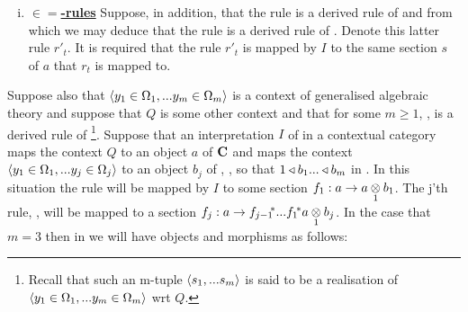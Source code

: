 \begin{enumerate}[(i)]
\item \underline{\textbf{$\boldsymbol{\in=}$-rules}} 
Suppose, in addition,  that the rule
is a derived rule of \gatUw and from which we may deduce that the rule
 is a  derived rule of \gatU. 
Denote this latter rule $r'_t$.
It is required that the rule $r'_t$ is mapped by $I$ to the same section $s$ of $a$ that $r_t$ is mapped to.
\end{enumerate}

\newpage

\label{omegarealisationwrtQ}
 Suppose also that $\encyOmega{m}$ is a context of generalised algebraic theory \gatUw and suppose that $Q$ is some other context and that for some $m \geq 1$,
 \foreachj,  is a derived rule of \gatU\footnote{Recall that such an m-tuple $\tuple{\sm}$ is said to be a realisation of 
$\encyOmega{m}$ wrt $Q$.}.  Suppose that an interpretation $I$ of \gatUw in a contextual category \catcw maps the context $Q$ to an object $a$  of $\catc$ and maps
the context $\encyOmega{j}$ to an object $b_j$ of \catc, \foreachj, so that $1 \base b_1 ... \base b_m$ in \catc. In this situation the rule 
 will be mapped by $I$ to some section $f_1:a \morph \crossx{a}{b_1}{1}$. The j'th rule,
, will be mapped to a section $f_j:a \morph \fjpstar ... \fonestar\crossx{a}{b_j}{1}$.
In the case that $m=3$  then in \catcw we will have objects and morphisms as follows:
